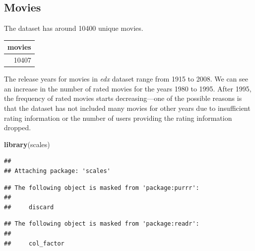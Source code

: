 \documentclass[]{article}
\newenvironment{Shaded}{\begin{snugshade}}{\end{snugshade}}
\newcommand{\CommentTok}[1]{\textcolor[rgb]{0.56,0.35,0.01}{\textit{#1}}}
\newcommand{\DataTypeTok}[1]{\textcolor[rgb]{0.13,0.29,0.53}{#1}}
\newcommand{\KeywordTok}[1]{\textcolor[rgb]{0.13,0.29,0.53}{\textbf{#1}}}
\newcommand{\NormalTok}[1]{#1}
\newcommand{\OperatorTok}[1]{\textcolor[rgb]{0.81,0.36,0.00}{\textbf{#1}}}
\newcommand{\StringTok}[1]{\textcolor[rgb]{0.31,0.60,0.02}{#1}}
\begin{document}
\subsection{Movies}
\label{sec:movies}

The dataset has around 10400 unique movies.

\begin{Shaded}
\end{Shaded}

\begin{longtable}[]{@{}r@{}}
\toprule
movies\tabularnewline
\midrule
\endhead
10407\tabularnewline
\bottomrule
\end{longtable}

The release years for movies in \emph{edx} dataset range from 1915 to
2008. We can see an increase in the number of rated movies for the years
1980 to 1995. After 1995, the frequency of rated movies starts
decreasing---one of the possible reasons is that the dataset has not
included many movies for other years due to insufficient rating
information or the number of users providing the rating information
dropped.

\begin{Shaded}
\begin{Highlighting}[]
\KeywordTok{library}\NormalTok{(scales)}
\end{Highlighting}
\end{Shaded}

\begin{verbatim}
## 
## Attaching package: 'scales'
\end{verbatim}

\begin{verbatim}
## The following object is masked from 'package:purrr':
## 
##     discard
\end{verbatim}

\begin{verbatim}
## The following object is masked from 'package:readr':
## 
##     col_factor
\end{verbatim}
\end{document}
